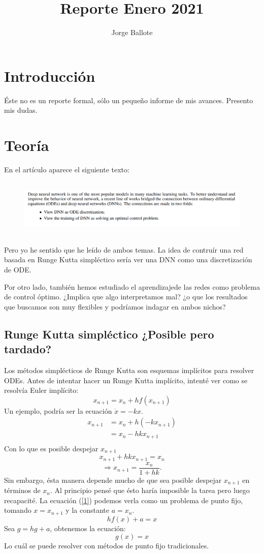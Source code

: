 \documentclass[12pt]{article}
\title{Reporte Enero 2021}
\author{Jorge Ballote}
\begin{document}
\maketitle
\section{Introducción}
Éste no es un reporte formal, sólo un pequeño informe de mis avances. Presento mis dudas.
\section{Teoría}
En el artículo \cite{surveyODEforDL} aparece el siguiente texto:
\begin{figure}[H]
    \includegraphics[height=1.1in]{../src/duda1.png}
\end{figure}
Pero yo he sentido que he leído de ambos temas. La idea de contruír una red basada en Runge Kutta simpléctico sería ver una DNN como una discretización de ODE.

Por otro lado, también hemos estudiado el aprendizajede las redes como problema de control óptimo. 
¿Implica que algo interpretamos mal? ¿o que los resultados que buscamos son muy flexibles y podríamos indagar en ambos nichos?

\subsection{Runge Kutta simpléctico ¿Posible pero tardado?}
Los métodos simplécticos de Runge Kutta son esquemas implícitos para resolver ODEs. Antes de intentar hacer un Runge Kutta implícito, intenté ver como se resolvía Euler implícito:
\begin{equation}
    \label{1}
    x_{n+1} = x_n + h f(x_{n+1})
\end{equation}
Un ejemplo, podría ser la ecuación $\dot x = -kx$.
\begin{align*}
    x_{n+1} &= x_n + h (-kx_{n+1}) \\
        &=x_n -hkx_{n+1} \\ 
\end{align*}
Con lo que es posible despejar $x_{n+1}$
$$ x_{n+1} +hkx_{n+1} = x_n $$
$$ \Rightarrow x_{n+1}  = \frac{x_n}{1+hk}.$$
Sin embargo, ésta manera depende mucho de que sea posible despejar $x_{n+1}$ en términos de $x_n$. Al principio pensé que ésto haría imposible la tarea pero luego recapacité. La ecuación (\ref{1}) podemos verla como un problema de punto fijo, tomando $x = x_{n+1}$ y la constante $a=x_n$.
\begin{equation}
    hf(x) + a = x
\end{equation}
Sea $g = hg +a$, obtenemos la ecuación:
$$g(x) = x$$
Lo cuál se puede resolver con métodos de punto fijo tradicionales.
\end{document}
